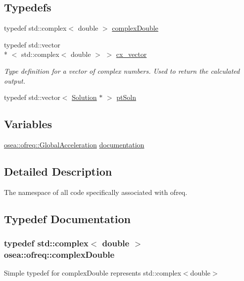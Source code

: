 \subsection*{Typedefs}
\begin{DoxyCompactItemize}
\item 
typedef std\-::complex$<$ double $>$ \hyperlink{namespaceosea_1_1ofreq_a40cad4695a41123a7ae6ab0b6e8b1664}{complex\-Double}
\item 
typedef std\-::vector\\*
$<$ std\-::complex$<$ double $>$ $>$ \hyperlink{namespaceosea_1_1ofreq_a42bf1d8bbba99693142c4184486ad3e0}{cx\-\_\-vector}
\begin{DoxyCompactList}\small\item\em Type definition for a vector of complex numbers. Used to return the calculated output. \end{DoxyCompactList}\item 
typedef std\-::vector$<$ \hyperlink{classosea_1_1ofreq_1_1_solution}{Solution} $\ast$ $>$ \hyperlink{namespaceosea_1_1ofreq_a951464fca478bccfc9e5295910e5eec3}{pt\-Soln}
\end{DoxyCompactItemize}
\subsection*{Variables}
\begin{DoxyCompactItemize}
\item 
\hyperlink{classosea_1_1ofreq_1_1_global_acceleration}{osea\-::ofreq\-::\-Global\-Acceleration} \hyperlink{namespaceosea_1_1ofreq_a0abf1323420ab8be986df47ea56c3948}{documentation}
\end{DoxyCompactItemize}


\subsection{Detailed Description}
The namespace of all code specifically associated with ofreq. 

\subsection{Typedef Documentation}
\hypertarget{namespaceosea_1_1ofreq_a40cad4695a41123a7ae6ab0b6e8b1664}{
\subsubsection[{complex\-Double}]{\setlength{\rightskip}{0pt plus 5cm}typedef std\-::complex$<$ double $>$ {\bf osea\-::ofreq\-::complex\-Double}}}\label{namespaceosea_1_1ofreq_a40cad4695a41123a7ae6ab0b6e8b1664}
Simple typedef for complex\-Double represents std\-::complex$<$double$>$ 

